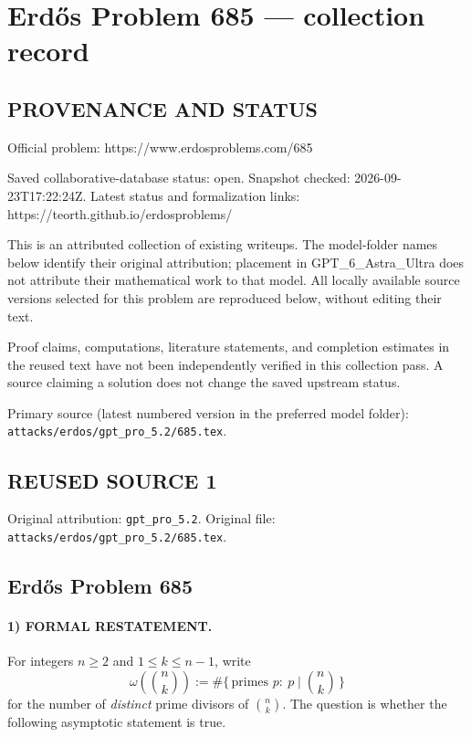 \section*{Erd\H{o}s Problem 685 --- collection record}

\subsection*{PROVENANCE AND STATUS}
Official problem: https://www.erdosproblems.com/685

Saved collaborative-database status: open.
Snapshot checked: 2026-09-23T17:22:24Z.
Latest status and formalization links: https://teorth.github.io/erdosproblems/

This is an attributed collection of existing writeups. The model-folder names below identify their original attribution; placement in GPT\_6\_Astra\_Ultra does not attribute their mathematical work to that model. All locally available source versions selected for this problem are reproduced below, without editing their text.

Proof claims, computations, literature statements, and completion estimates in the reused text have not been independently verified in this collection pass. A source claiming a solution does not change the saved upstream status.

Primary source (latest numbered version in the preferred model folder): \texttt{attacks/erdos/gpt\_pro\_5.2/685.tex}.

\subsection*{REUSED SOURCE 1}
Original attribution: \texttt{gpt\_pro\_5.2}.
Original file: \texttt{attacks/erdos/gpt\_pro\_5.2/685.tex}.


\subsection*{Erd\H{o}s Problem 685}

\paragraph{1) FORMAL RESTATEMENT.}
For integers $n\ge 2$ and $1\le k\le n-1$, write
\[
\omega\!\left(\binom{n}{k}\right):=\#\{\,\text{primes }p:\ p\mid \binom{n}{k}\,\}
\]
for the number of \emph{distinct} prime divisors of $\binom{n}{k}$.
The question is whether the following asymptotic statement is true.

